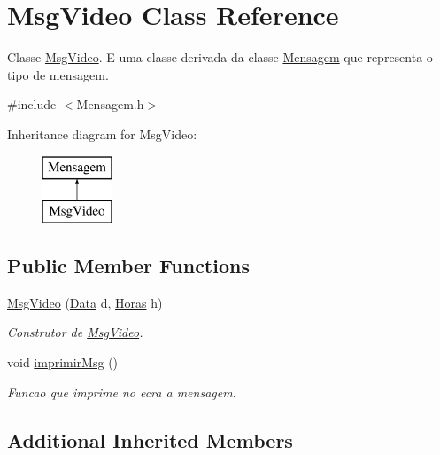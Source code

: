 \hypertarget{class_msg_video}{}\section{Msg\+Video Class Reference}
\label{class_msg_video}


Classe \hyperlink{class_msg_video}{Msg\+Video}. E uma classe derivada da classe \hyperlink{class_mensagem}{Mensagem} que representa o tipo de mensagem.  




{\ttfamily \#include $<$Mensagem.\+h$>$}

Inheritance diagram for Msg\+Video\+:\begin{figure}[H]
\begin{center}
\leavevmode
\includegraphics[height=2.000000cm]{class_msg_video}
\end{center}
\end{figure}
\subsection*{Public Member Functions}
\begin{DoxyCompactItemize}
\item 
\hyperlink{class_msg_video_aef9a682492022a03ff4ea1ab62e1e1f9}{Msg\+Video} (\hyperlink{class_data}{Data} d, \hyperlink{class_horas}{Horas} h)
\begin{DoxyCompactList}\small\item\em Construtor de \hyperlink{class_msg_video}{Msg\+Video}. \end{DoxyCompactList}\item 
\hypertarget{class_msg_video_a9073f476d181d88e03c6cbf4c283533d}{}void \hyperlink{class_msg_video_a9073f476d181d88e03c6cbf4c283533d}{imprimir\+Msg} ()\label{class_msg_video_a9073f476d181d88e03c6cbf4c283533d}

\begin{DoxyCompactList}\small\item\em Funcao que imprime no ecra a mensagem. \end{DoxyCompactList}\end{DoxyCompactItemize}
\subsection*{Additional Inherited Members}


